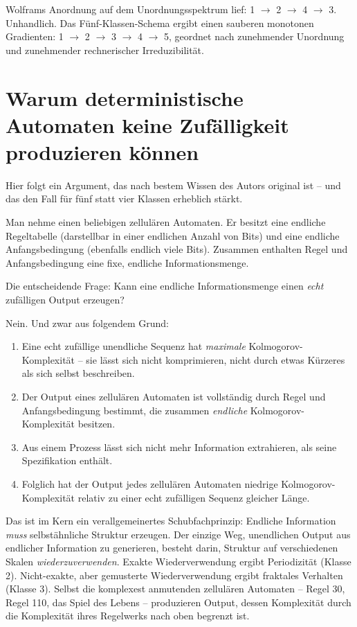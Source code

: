 \documentclass[11pt, twoside, openright]{book}
\begin{document}
Wolframs Anordnung auf dem Unordnungsspektrum lief: 1 $\rightarrow$ 2 $\rightarrow$ 4 $\rightarrow$ 3. Unhandlich. Das Fünf-Klassen-Schema ergibt einen sauberen monotonen Gradienten: 1 $\rightarrow$ 2 $\rightarrow$ 3 $\rightarrow$ 4 $\rightarrow$ 5, geordnet nach zunehmender Unordnung und zunehmender rechnerischer Irreduzibilität.

\section*{Warum deterministische Automaten keine Zufälligkeit produzieren können}

Hier folgt ein Argument, das nach bestem Wissen des Autors original ist -- und das den Fall für fünf statt vier Klassen erheblich stärkt.

Man nehme einen beliebigen zellulären Automaten. Er besitzt eine endliche Regeltabelle (darstellbar in einer endlichen Anzahl von Bits) und eine endliche Anfangsbedingung (ebenfalls endlich viele Bits). Zusammen enthalten Regel und Anfangsbedingung eine fixe, endliche Informationsmenge.

Die entscheidende Frage: Kann eine endliche Informationsmenge einen \textit{echt} zufälligen Output erzeugen?

Nein. Und zwar aus folgendem Grund:

\begin{enumerate}
  \item Eine echt zufällige unendliche Sequenz hat \textit{maximale} Kolmogorov-Komplexität -- sie lässt sich nicht komprimieren, nicht durch etwas Kürzeres als sich selbst beschreiben.
  \item Der Output eines zellulären Automaten ist vollständig durch Regel und Anfangsbedingung bestimmt, die zusammen \textit{endliche} Kolmogorov-Komplexität besitzen.
  \item Aus einem Prozess lässt sich nicht mehr Information extrahieren, als seine Spezifikation enthält.
  \item Folglich hat der Output jedes zellulären Automaten niedrige Kolmogorov-Komplexität relativ zu einer echt zufälligen Sequenz gleicher Länge.
\end{enumerate}

Das ist im Kern ein verallgemeinertes Schubfachprinzip: Endliche Information \textit{muss} selbstähnliche Struktur erzeugen. Der einzige Weg, unendlichen Output aus endlicher Information zu generieren, besteht darin, Struktur auf verschiedenen Skalen \textit{wiederzuverwenden}. Exakte Wiederverwendung ergibt Periodizität (Klasse 2). Nicht-exakte, aber gemusterte Wiederverwendung ergibt fraktales Verhalten (Klasse 3). Selbst die komplexest anmutenden zellulären Automaten -- Regel 30, Regel 110, das Spiel des Lebens -- produzieren Output, dessen Komplexität durch die Komplexität ihres Regelwerks nach oben begrenzt ist.
\end{document}
